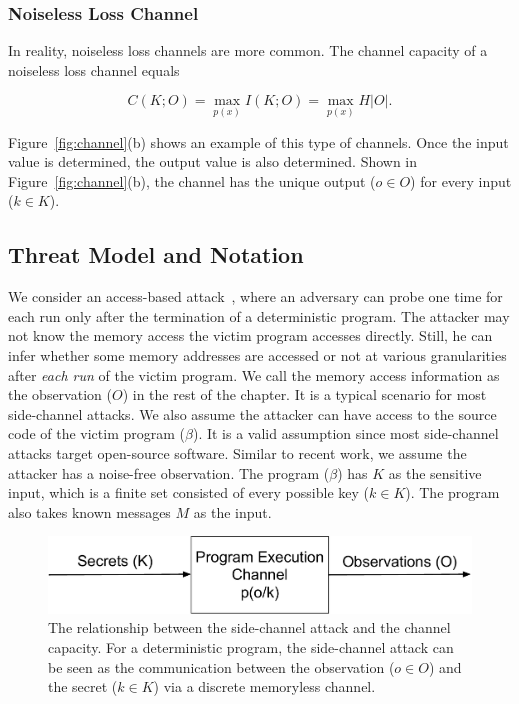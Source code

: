 \subsubsection{Noiseless Loss Channel}
In reality, noiseless loss channels are more common. The channel capacity of a noiseless loss channel equals

\begin{equation} \label{chapter:eq:5}
  C(K;O) = \max_{p(x)} I(K;O) = \max_{p(x)} H |O|.
\end{equation}

Figure~\ref{fig:channel}(b) shows an example of this type of channels. Once the input value is determined, the output value is also determined. Shown in Figure~\ref{fig:channel}(b), the channel has the unique output ($o \in O$) for every input ($k \in K$).


\subsection{Threat Model and Notation}


We consider an access-based attack~\cite{ge2018survey}, where an adversary can probe one time for each run only after the termination of a deterministic program. The attacker may not know the memory access the victim program accesses directly. Still, he can infer whether some memory addresses are accessed or not at various granularities after \textit{each run} of the victim program. We call the memory access information as the observation ($O$) in the rest of the chapter. It is a typical scenario for most side-channel attacks.  We also assume the attacker can have access to the source code of the victim program ($\beta$). It is a valid assumption since most side-channel attacks target open-source software. Similar to recent work, we assume the attacker has a noise-free observation.  The program ($\beta$) has $K$ as the sensitive input, which is a finite set consisted of every possible key ($k \in K$). The program also takes known messages $M$ as the input. 

\begin{figure}[ht]
  \centering
  \includegraphics[width=.75\columnwidth]{./figures/chapter5/channel.pdf}
  \caption{The relationship between the side-channel attack and the channel capacity. For a deterministic program, the side-channel attack can be seen as the communication between the observation ($o \in O$) and the secret ($k \in K$) via a discrete memoryless channel.}
  \label{fig:side_channel}
\end{figure}

